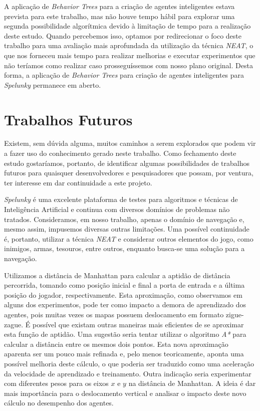 A aplicação de \textit{Behavior Trees} para a criação de agentes inteligentes
estava prevista para este trabalho, mas não houve tempo hábil para explorar uma
segunda possibilidade algorítmica devido à limitação de tempo para a realização
deste estudo. Quando percebemos isso, optamos por redirecionar o foco deste
trabalho para uma avaliação mais aprofundada da utilização da técnica
\textit{NEAT}, o que nos forneceu mais tempo para realizar melhorias e executar
experimentos que não teríamos como realizar caso prosseguíssemos com nosso plano
original. Desta forma, a aplicação de \textit{Behavior Trees} para criação de
agentes inteligentes para \textit{Spelunky} permanece em aberto.


\section{Trabalhos Futuros}
Existem, sem dúvida alguma, muitos caminhos a serem explorados que podem vir a
fazer uso do conhecimento gerado neste trabalho. Como fechamento deste estudo
gostaríamos, portanto, de identificar algumas possibilidades de trabalhos
futuros para quaisquer desenvolvedores e pesquisadores que possam, por ventura,
ter interesse em dar continuidade a este projeto.

\textit{Spelunky} é uma excelente plataforma de testes para algoritmos e
técnicas de Inteligência Artificial e continua com diversos domínios de
problemas não tratados. Consideramos, em nosso trabalho, apenas o domínio de
navegação e, mesmo assim, impusemos diversas outras limitações. Uma possível
continuidade é, portanto, utilizar a técnica \textit{NEAT} e considerar outros
elementos do jogo, como inimigos, armas, tesouros, entre outros, enquanto
busca-se uma solução para a navegação.

Utilizamos a distância de Manhattan para calcular a aptidão de distância
percorrida, tomando como posição inicial e final a porta de entrada e a última
posição do jogador, respectivamente. Esta aproximação, como observamos em alguns
dos experimentos, pode ter como impacto a demora de aprendizado dos agentes,
pois muitas vezes os mapas possuem deslocamento em formato zigue-zague. É
possível que existam outras maneiras mais eficientes de se aproximar esta função
de aptidão. Uma sugestão seria tentar utilizar o algoritmo \textit{A*} para
calcular a distância entre os mesmos dois pontos. Esta nova aproximação aparenta
ser um pouco mais refinada e, pelo menos teoricamente, aponta uma possível
melhoria deste cálculo, o que poderia ser traduzido como uma aceleração da
velocidade de aprendizado e treinamento. Outra indicação seria experimentar com
diferentes pesos para os eixos $x$ e $y$ na distância de Manhattan.  A ideia é
dar mais importância para o deslocamento vertical e analisar o impacto deste
novo cálculo no desempenho dos agentes.

